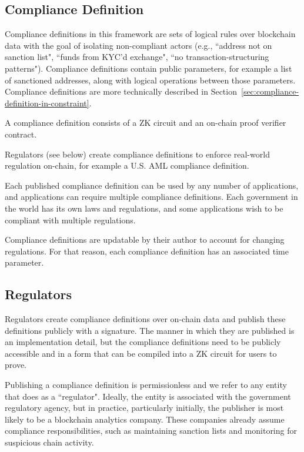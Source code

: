\documentclass[9pt]{extreport}
\begin{document}
\subsection{Compliance Definition}

Compliance definitions in this framework are sets of logical rules over blockchain data with the goal of isolating non-compliant actors (e.g., ``address not on sanction list", ``funds from KYC'd exchange", ``no transaction-structuring patterns").  Compliance definitions contain public parameters, for example a list of sanctioned addresses, along with logical operations between those parameters.  Compliance definitions are more technically described in Section~\ref{sec:compliance-definition-in-constraint}.

A compliance definition consists of a ZK circuit and an on-chain proof verifier contract. 

Regulators (see below) create compliance definitions to enforce real-world regulation on-chain, for example a U.S. AML compliance definition.

Each published compliance definition can be used by any number of applications, and applications can require multiple compliance definitions.  Each government in the world has its own laws and regulations, and some applications wish to be compliant with multiple regulations.

Compliance definitions are updatable by their author to account for changing regulations.  For that reason, each compliance definition has an associated time parameter.

\subsection{Regulators}
\label{sec:regulators}
Regulators create compliance definitions over on-chain data and publish these definitions publicly with a signature.  The manner in which they are published is an implementation detail, but the compliance definitions need to be publicly accessible and in a form that can be compiled into a ZK circuit for users to prove.

Publishing a compliance definition is permissionless and we refer to any entity that does as a ``regulator".  Ideally, the entity is  associated with the government regulatory agency, but in practice, particularly initially, the publisher is most likely to be a blockchain analytics company.  These companies already assume compliance responsibilities, such as maintaining sanction lists and monitoring for suspicious chain activity.
\end{document}
